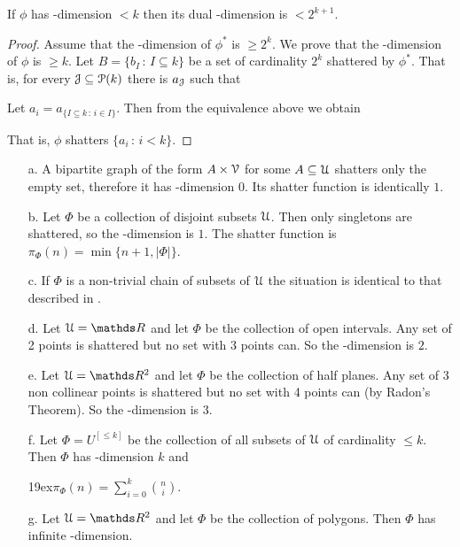 \documentclass[sputnik.tex]{subfiles}
\begin{document}
\begin{proposition}
If $\phi$ has \vc-dimension $< k$ then its dual \vc-dimension is $< 2^{k+1}$.
\end{proposition}

\begin{proof}
Assume that the \vc-dimension of $\phi^*$ is $\ge 2^k$.
We prove that the \vc-dimension of $\phi$ is $\ge k$.
Let $B=\{b_I\,:\,I\subseteq k\}$ be a set of cardinality $2^k$ shattered by $\phi^*$. 
That is, for every $\EuScript J\subseteq \EuScript P(k)$ there is $a_\EuScript J$ such that


Let $a_i=a_{\{I\subseteq k\,:\, i\in I\}}$. Then from the equivalence above we obtain


That is, $\phi$ shatters $\{a_i\,:\,i<k\}$.
\end{proof}

\begin{example}\label{ex_vcdim}
\begin{itemize}
\item[a.] A bipartite graph of the form $A\times\EuScript V$ for some $A\subseteq\EuScript U$ shatters only the empty set, therefore it has \vc-dimension $0$.
Its shatter function is identically $1$.
\item[b.] Let $\Phi$ be a collection of disjoint subsets $\EuScript U$.
Then only singletons are shattered, so the \vc-dimension is $1$.
The shatter function is $\pi_\Phi(n)=\min\big\{n+1,|\Phi|\big\}$.
\item[c.] If $\Phi$ is a non-trivial chain of subsets of $\EuScript U$ the situation is identical to that described in .
\item[d.] Let $\U=\RR$ and let $\Phi$ be the collection of open intervals.
Any set of 2 points is shattered but no set with 3 points can.
So the \vc-dimension is $2$.
\item[e.] Let $\U=\RR^2$ and let $\Phi$ be the collection of half planes.
Any set of 3 non collinear points is shattered but no set with 4 points can (by Radon's Theorem).
So the \vc-dimension is $3$.
\item[f.] Let $\Phi=U^{[\le k]}$ be the collection of all subsets of $\EuScript U$ of cardinality $\le k$.
Then $\Phi$ has \vc-dimension $k$ and

\noindent\kern19ex$\displaystyle\pi_\Phi(n)=\sum^k_{i=0} \binom{n}{i}$.


\item[g.] Let $\U=\RR^2$ and let $\Phi$ be the collection of polygons.
Then $\Phi$ has infinite \vc-dimension.\QED
\end{itemize}
\end{example}
\end{document}

